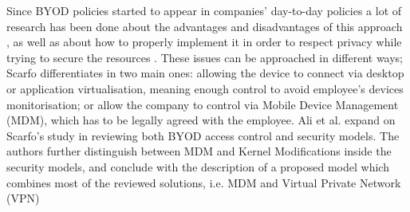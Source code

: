 \documentclass[a4paper,10pt,twocolumn,preprint,3p]{elsarticle}
\begin{document}
Since BYOD policies started to appear in companies' day-to-day policies  a lot
of research has been done about the advantages and disadvantages of
this approach \cite{singh2012byod}, as well as about how to properly implement it in order to
respect privacy while trying to secure the resources \cite{scarfo2012new, ali2015analysis, de2015corporate}. %
These issues can be approached in different ways; Scarfo
differentiates in \cite{scarfo2012new} two main ones: allowing the
device to connect via desktop or application virtualisation, meaning
enough control to avoid employee's devices monitorisation; or allow
the company to control
via Mobile Device Management (MDM), which has to be legally agreed
with the employee. %
 Ali et al. expand on Scarfo's study in
\cite{ali2015analysis}  reviewing both BYOD access control
 and security models. The authors further distinguish
between MDM and Kernel Modifications inside the security models, and
conclude with the description of a proposed model which combines most
of the reviewed solutions, i.e. MDM and Virtual Private Network (VPN)
\end{document}
